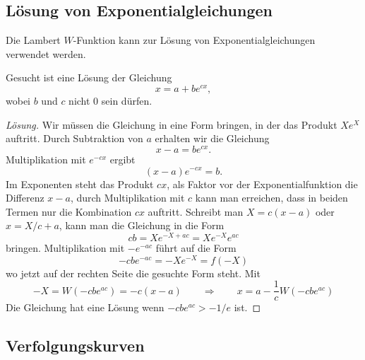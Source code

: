%
%
\subsection{Lösung von Exponentialgleichungen
\label{buch:subsection:loesung-von-exponentialgleichungen}}
Die Lambert $W$-Funktion kann zur Lösung von Exponentialgleichungen
verwendet werden.

\begin{aufgabe}
Gesucht ist eine Lösung der Gleichung
\[
x=a+be^{cx},
\]
wobei $b$ und $c$ nicht $0$ sein dürfen.
\end{aufgabe}

\begin{proof}[Lösung]
Wir müssen die Gleichung in eine Form bringen, in der das Produkt 
$Xe^X$ auftritt.
Durch Subtraktion von $a$ erhalten wir die Gleichung 
\[
x-a = be^{cx}.
\]
Multiplikation mit $e^{-cx}$ ergibt
\[
(x-a)e^{-cx}=b.
\]
Im Exponenten steht das Produkt $cx$, als Faktor vor der Exponentialfunktion
die Differenz $x-a$, durch Multiplikation mit $c$ kann man erreichen,
dass in beiden Termen nur die Kombination $cx$ auftritt.
Schreibt man $X=c(x-a)$ oder $x=X/c+a$, kann man die Gleichung in die Form
\[
cb
=
Xe^{-X+ac}
=
Xe^{-X}e^{ac}
\]
bringen.
Multiplikation mit $-e^{-ac}$ führt auf die Form
\[
-cbe^{-ac}
=
-Xe^{-X}
=
f(-X)
\]
wo jetzt auf der rechten Seite die gesuchte Form steht.
Mit 
\[
-X
=
W(-cbe^{ac})
=
-c(x-a)
\qquad\Rightarrow\qquad
x
=
a
-
\frac{1}{c}
W(-cbe^{ac})
\]
Die Gleichung hat eine Lösung wenn $-cbe^{ac} > -1/e$ ist.
\end{proof}


%
%
\subsection{Verfolgungskurven
\label{buch:subsection:verfolgungskurven}}








